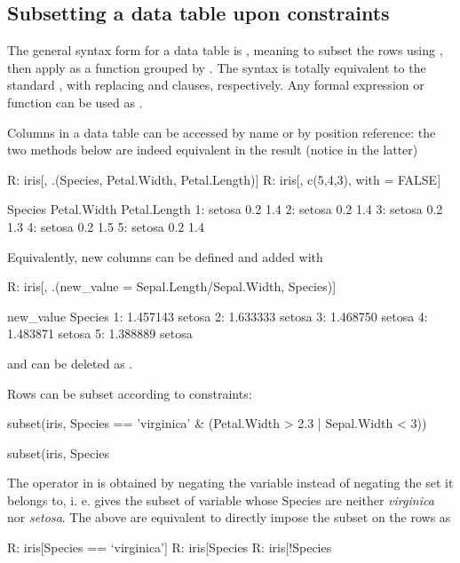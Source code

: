 \subsection{Subsetting a data table upon constraints}
The general syntax form for a data table is 
, meaning to subset the rows using 
, then apply  as a function grouped by
. The syntax is totally equivalent to the 
standard , with  replacing 
 and  clauses, respectively.
Any formal expression or function can be used 
as .
\bigskip 

Columns in a data table can be accessed by name 
or by position reference: the two methods below are
indeed equivalent in the result (notice 
 in the latter)
\begin{example}
R: iris[, .(Species, Petal.Width, Petal.Length)]
R: iris[, c(5,4,3), with = FALSE]

       Species Petal.Width Petal.Length
  1:    setosa         0.2          1.4
  2:    setosa         0.2          1.4
  3:    setosa         0.2          1.3
  4:    setosa         0.2          1.5
  5:    setosa         0.2          1.4 
\end{example}
\bigskip 

Equivalently, new columns can be defined and added
with
\begin{example}
R: iris[, .(new_value = Sepal.Length/Sepal.Width, Species)]

     new_value   Species
  1:  1.457143    setosa
  2:  1.633333    setosa
  3:  1.468750    setosa
  4:  1.483871    setosa
  5:  1.388889    setosa
\end{example}
and can be deleted as
.
\bigskip

Rows can be subset according to constraints:
\begin{example}
subset(iris, 
       Species == 'virginica'
       & (Petal.Width > 2.3 | Sepal.Width < 3)) 
       
subset(iris,
       Species %
\end{example}
The  operator in  is obtained
by negating the variable instead of negating 
the set it belongs to, i. e. 
gives the subset of variable whose Species are neither 
\emph{virginica} nor \emph{setosa}. The above are 
equivalent to directly impose the subset 
on the rows as
\begin{example}
R: iris[Species == `virginica']
R: iris[Species %
R: iris[!Species %
\end{example}
\bigskip 

